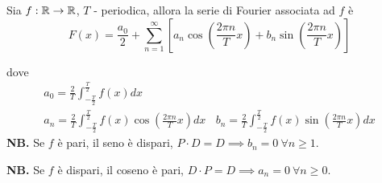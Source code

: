 \begin{thm}
Sia $f:\mathbb{R} \rightarrow \mathbb{R} $, $T$ - periodica, allora la serie di Fourier associata ad $f$ è
\begin{equation*}
F(x) = \frac{a_{0}}{2} + \sum\limits^{\infty}_{n = 1}\left[ a_{n}\cos\left(\frac{2\pi n}{T} x\right) + b_{n}\sin\left(\frac{2\pi n}{T} x\right)\right]
\end{equation*}

dove
\begin{gather*}
a_{0} = \frac{2}{T}\int^{\frac{T}{2}}_{- \frac{T}{2}} f(x) dx\\
a_{n} = \frac{2}{T}\int^{\frac{T}{2}}_{- \frac{T}{2}} f(x)\cos\left(\frac{2\pi n}{T} x\right) dx\ \ \ \ b_{n} = \frac{2}{T}\int^{\frac{T}{2}}_{- \frac{T}{2}} f(x)\sin\left(\frac{2\pi n}{T} x\right) dx
\end{gather*}
\textbf{NB.} Se $f$ è pari, il seno è dispari, $P \cdot D = D\implies b_{n} = 0\ \forall n \geq 1$.

\textbf{NB.} Se $f$ è dispari, il coseno è pari, $D \cdot P = D\implies a_{n} = 0\ \forall n \geq 0$.
\end{thm}
